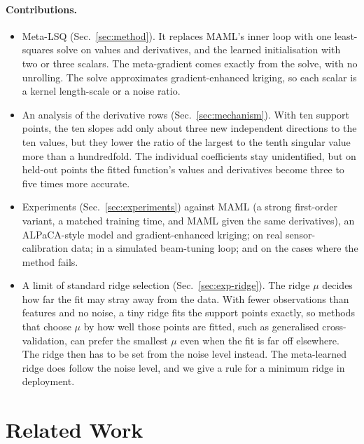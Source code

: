 \documentclass[fullpaper,final]{nldl}
\theoremstyle{plain}
\theoremstyle{definition}
\begin{document}
\paragraph{Contributions.}
\begin{itemize}[leftmargin=*,itemsep=1pt,topsep=2pt]
\item Meta-LSQ (Sec.~\ref{sec:method}). It replaces MAML's inner loop with one
least-squares solve on values and derivatives, and the learned initialisation with
two or three scalars. The meta-gradient comes exactly from the solve, with no
unrolling. The solve approximates gradient-enhanced kriging, so each scalar is a
kernel length-scale or a noise ratio.
\item An analysis of the derivative rows (Sec.~\ref{sec:mechanism}). With ten
support points, the ten slopes add only about three new independent directions to
the ten values, but they lower the ratio of the largest to the tenth singular
value more than a hundredfold. The individual coefficients stay unidentified, but
on held-out points the fitted function's values and derivatives become three to five
times more accurate.
\item Experiments (Sec.~\ref{sec:experiments}) against MAML (a strong first-order
variant, a matched training time, and MAML given the same derivatives), an
ALPaCA-style model and gradient-enhanced kriging; on real sensor-calibration data;
in a simulated beam-tuning loop; and on the cases where the method fails.
\item A limit of standard ridge selection (Sec.~\ref{sec:exp-ridge}). The ridge
$\mu$ decides how far the fit may stray away from the data. With fewer observations
than features and no noise, a tiny ridge fits the support points exactly, so methods
that choose $\mu$ by how well those points are fitted, such as generalised
cross-validation, can prefer the smallest $\mu$ even when the fit is far off
elsewhere. The ridge then has to be set from the noise level instead. The
meta-learned ridge does follow the noise level, and we give a rule for a minimum
ridge in deployment.
\end{itemize}

\section{Related Work}
\label{sec:related}
\end{document}
